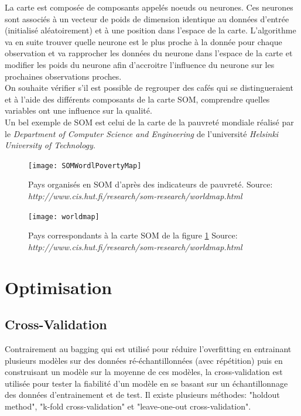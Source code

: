\noindent La carte est composée de composants appelés noeuds ou neurones. Ces neurones sont associés à un vecteur de poids de dimension identique au données d'entrée (initialisé aléatoirement) et à une position dans l'espace de la carte. L'algorithme va en suite trouver quelle neurone est le plus proche à la donnée pour chaque observation et va rapprocher les données du neurone dans l'espace de la carte et modifier les poids du neurone afin d'accroitre l'influence du neurone sur les prochaines observations proches\cite{Kohonen:1988:SFT:65669.104428}.\\


\noindent On souhaite vérifier s'il est possible de regrouper des cafés qui se distingueraient et à l'aide des différents composants de la carte SOM, comprendre quelles variables ont une influence sur la qualité. \\
 

\noindent Un bel exemple de SOM est celui de la carte de la pauvreté mondiale réalisé par le \textit{Department of Computer Science and Engineering} de l'université \textit{Helsinki University of Technology}. 

\begin{figure}[H]
	\texttt{[image: SOMWordlPovertyMap]}
	\caption{\label{SOMPovertyMap} Pays organisés en SOM d'après des indicateurs de pauvreté. \newline Source: \textit{http://www.cis.hut.fi/research/som-research/worldmap.html}}
\end{figure}

\begin{figure}[H]
	\texttt{[image: worldmap]}
	\caption{\label{WorldPovertyMap} Pays correspondants à la carte SOM de la figure \ref{SOMPovertyMap} \newline Source: \textit{http://www.cis.hut.fi/research/som-research/worldmap.html}}
\end{figure}



\section{Optimisation}

\subsection{Cross-Validation}

Contrairement au bagging qui est utilisé pour réduire l'overfitting en entrainant plusieurs modèles sur des données ré-échantillonnées (avec répétition) puis en construisant un modèle sur la moyenne de ces modèles, la cross-validation est utilisée pour tester la fiabilité d'un modèle en se basant sur un échantillonnage des données d'entrainement et de test. Il existe plusieurs méthodes: "holdout method", "k-fold cross-validation" et "leave-one-out cross-validation".\\

